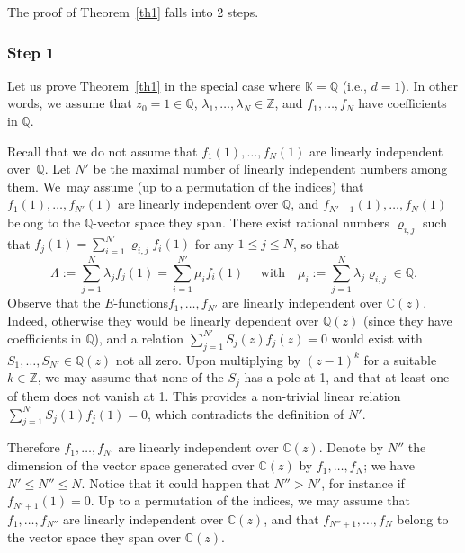 \documentclass[11pt]{article}
\numberwithin{equation}{section}
\newcommand{\Efunctions}{$E$\nobreakdash-func\-tions\xspace}
\theoremstyle{definition}
\newcommand{\Z}{\mathbb{Z}}
\newcommand{\Q}{\mathbb{Q}}
\newcommand{\C}{\mathbb{C}}
\newcommand{\K}{\mathbb{K}}
\begin{document}
The proof of Theorem~\ref{th1} falls into 2 steps.

\subsubsection*{Step 1}
Let us prove Theorem~\ref{th1} in the special case where $\K=\Q$ (i.e., $d=1$). In other words, we assume that $z_0=1\in\Q$, $\lambda_1,\ldots,\lambda_N\in\Z$, and $f_1,\ldots,f_N$ have coefficients in $\Q$.

Recall that we do not assume that $f_1(1),\ldots,f_N(1)$ are linearly independent over~$\Q$. Let $N'$ be the maximal number of linearly independent numbers among them. We~may assume (up to a permutation of the indices) that $f_1(1),\ldots,f_{N'}(1)$ are linearly independent over $\Q$, and $f_{N'+1}(1),\ldots,f_{N}(1)$ belong to the $\Q$-vector space they span. There exist rational numbers $\varrho_{i,j} $ such that
$f_j(1) = \sum_{i=1}^{N'} \varrho_{i,j} f_i(1)$ for any $1\leq j \leq N$, so that
\begin{equation}\label{eqlam2}
\Lambda := \sum_{j=1}^N \lambda_j f_j(1) = \sum_{i=1}^{N'} \mu_i f_i(1) \quad \mbox{ with} \quad
\mu_i := \sum_{j=1}^N \lambda_j \varrho_{i,j}\in\Q.
\end{equation}
Observe that the \Efunctions $f_1,\ldots,f_{N'}$ are linearly independent over $\C(z)$. Indeed, otherwise they would be linearly dependent over $\Q(z)$ (since they have coefficients in $\Q$), and a relation $\sum_{j=1}^{N'} S_j(z) f_j(z)=0$ would exist with $S_1, \ldots, S_{N'}\in \Q(z)$ not all zero. Upon multiplying by $(z-1)^k$ for a suitable $k\in\Z$, we may assume that none of the $S_j$ has a pole at 1, and that at least one of them does not vanish at 1. This provides a non-trivial linear relation $\sum_{j=1}^{N'} S_j(1) f_j(1)=0$, which contradicts the definition of $N'$.

Therefore $f_1,\ldots,f_{N'}$ are linearly independent over $\C(z)$. Denote by $N''$ the dimension of the vector space generated over $\C(z)$ by $f_1,\ldots,f_{N}$; we have $N'\leq N''\leq N$. Notice that it could happen that $N''>N'$, for instance if $f_{N'+1}(1)=0$. Up to a permutation of the indices, we may assume that $f_1,\ldots,f_{N''}$ are linearly independent over $\C(z)$, and that
$f_{N''+1},\ldots,f_{N}$ belong to the vector space they span over $\C(z)$.
\end{document}
